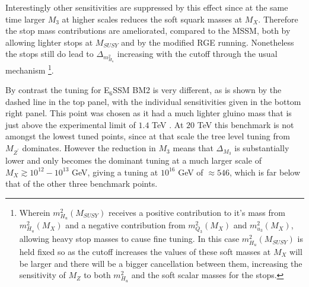 \documentclass[preprint,amsmath,amssymb,aps,superscriptaddress,prd,
showpacs,floatfix,nofootinbib]{revtex4-1}
\begin{document}
Interestingly other sensitivities are suppressed by this effect since
at the same time larger $M_3$ at higher scales reduces the soft squark
masses at $M_X$.  Therefore the stop mass contributions are
ameliorated, compared to the MSSM, both by allowing lighter stops at
$M_{SUSY}$ and by the modified RGE running.  Nonetheless the stops
still do lead to $\Delta_{m_{H_u}^2}$ increasing with the cutoff
through the usual mechanism \footnote{Wherein $m_{H_u}^2(M_{SUSY})$
receives a positive contribution to it's mass from $m_{H_u}^2(M_X)$
and a negative contribution from $m_{Q_3}^2(M_X)$ and
$m_{u_3}^2(M_X)$, allowing heavy stop masses to cause fine
tuning.  In this case $m_{H_u}^2(M_{SUSY})$ is held fixed so as the
cutoff increases the values of these soft masses at $M_X$ will be
larger and there will be a bigger cancellation between them,
increasing the sensitivity of $M_Z$ to both $m_{H_u}^2$ and the soft
scalar masses for the stops.}.

By contrast the tuning for E$_6$SSM BM2 is very different, as is shown
by the dashed line in the top panel, with the individual sensitivities given
in the bottom right panel.  This point was chosen as it had a much lighter
gluino mass that is just above the experimental limit of $1.4$ TeV
\cite{Aad:2014lra}.  At $20$ TeV this benchmark is not amongst the
lowest tuned points, since at that scale the tree level tuning from
$M_{Z^\prime}$ dominates.  However the reduction in $M_3$ means that
$\Delta_{M_3}$ is substantially lower and only becomes the dominant
tuning at a much larger scale of $M_X \gtrsim 10^{12} - 10^{13}$ GeV,
giving a tuning at $10^{16}$ GeV of $\approx 546$, which is far below
that of the other three benchmark points.
\end{document}
